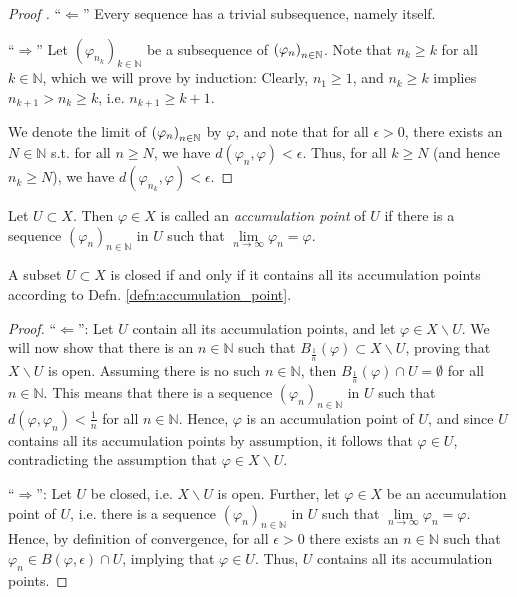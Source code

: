 \begin{proof}[Proof \cite{213285}]
	\enquote{$\Longleftarrow$} Every sequence has a trivial subsequence, namely itself.
	
	\enquote{$\Longrightarrow$} Let $\left(\varphi_{n_k}\right)_{k\in\mathbb N}$ be a subsequence of $\seq[\varphi_n]$. Note that $n_k \geq k$ for all $k\in\mathbb N$, which we will prove by induction: Clearly, $n_1\geq 1$, and $n_k\geq k$ implies $n_{k + 1} > n_{k} \geq k$, i.e. $n_{k + 1}\geq k + 1$. 
	
	We denote the limit of $\seq[\varphi_n]$ by $\varphi$, and note that for all $\epsilon > 0$, there exists an $N\in\mathbb N$ s.t. for all $n \geq N$, we have $d(\varphi_n, \varphi) < \epsilon$. Thus, for all $k\geq N$ (and hence $n_k\geq N$), we have $d(\varphi_{n_k}, \varphi) < \epsilon$.
\end{proof}

\begin{defn}\label{defn:accumulation_point}
	Let $U\subset X$. Then $\varphi\in X$ is called an \textit{accumulation point} of $U$ if there is a sequence $\left(\varphi_{n}\right)_{n\in \mathbb N}$ in $U$ such that $\lim\limits_{n\to\infty}\varphi_{n} = \varphi$.
\end{defn}

\begin{theorem}\label{thm:closed_set_acc_point}
	A subset $U \subset X$ is closed if and only if it contains all its accumulation points according to Defn. \ref{defn:accumulation_point}.
\end{theorem}

\begin{proof}
	\enquote{$\Longleftarrow$}: Let $U$ contain all its accumulation points, and let $\varphi\in X\backslash U$. We will now show that there is an $n\in \mathbb N$ such that $B_{\frac{1}{n}}(\varphi) \subset X\backslash U$, proving that $X\backslash U$ is open. Assuming there is no such $n\in \mathbb N$, then $B_{\frac{1}{n}}(\varphi) \cap U = \emptyset$ for all $n\in \mathbb N$. This means that there is a sequence $(\varphi_{n})_{n\in\mathbb N}$ in $U$ such that $d(\varphi, \varphi_n) < \frac{1}{n}$ for all $n\in\mathbb N$. Hence, $\varphi$ is an accumulation point of $U$, and since $U$ contains all its accumulation points by assumption, it follows that $\varphi\in U$, contradicting the assumption that $\varphi\in X\backslash U$.
	
	\enquote{$\Longrightarrow$}: Let $U$ be closed, i.e. $X\backslash U$ is open. Further, let $\varphi\in X$ be an accumulation point of $U$, i.e. there is a sequence $(\varphi_n)_{n\in\mathbb N}$ in $U$ such that $\lim\limits_{n\to\infty}\varphi_n = \varphi$. Hence, by definition of convergence, for all $\epsilon > 0$ there exists an $n\in\mathbb N$ such that $\varphi_n\in B(\varphi, \epsilon) \cap U$, implying that $\varphi\in U$. Thus, $U$ contains all its accumulation points.
\end{proof}

